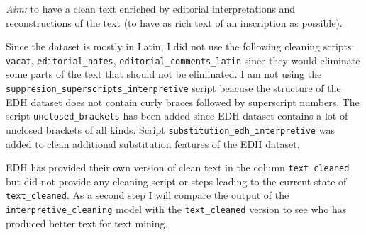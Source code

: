 \documentclass[]{article}
\begin{document}
\emph{Aim:} to have a clean text enriched by editorial interpretations
and reconstructions of the text (to have as rich text of an inscription
as possible).

Since the dataset is mostly in Latin, I did not use the following
cleaning scripts: \texttt{vacat}, \texttt{editorial\_notes},
\texttt{editorial\_comments\_latin} since they would eliminate some
parts of the text that should not be eliminated. I am not using the
\texttt{suppresion\_superscripts\_interpretive} script beacuse the
structure of the EDH dataset does not contain curly braces followed by
superscript numbers. The script \texttt{unclosed\_brackets} has been
added since EDH dataset contains a lot of unclosed brackets of all
kinds. Script \texttt{substitution\_edh\_interpretive} was added to
clean additional substitution features of the EDH dataset.

EDH has provided their own version of clean text in the column
\texttt{text\_cleaned} but did not provide any cleaning script or steps
leading to the current state of \texttt{text\_cleaned}. As a second step
I will compare the output of the \texttt{interpretive\_cleaning} model
with the \texttt{text\_cleaned} version to see who has produced better
text for text mining.
\end{document}
